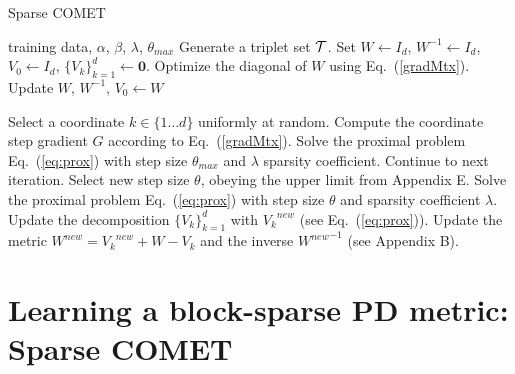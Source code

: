 \documentclass[twoside,11pt]{article}
\newcommand\mat[1]{{#1}}
\renewcommand\vec[1]{\mathbf{#1}}
\newcommand{\W}{\mat{W}}
\newcommand{\newW}{{\mat{W^{new}}}}
\newcommand{\ignore}[1]{}
\newcommand{\Vk}{\mat{V_k}}
\newcommand{\Vz}{\mat{V_0}}
\newcommand{\Vgrc}{\{\Vk\}_{k=1}^{d}} %
\newcommand{\cholL}{\mat{L}}
\renewcommand{\eqref}[1]{Eq.~(\ref{#1})}
\begin{document}
\begin{algorithm}[t]
   \caption{Sparse COMET}
   \label{alg:spcomet}
\begin{algorithmic}[1]
    training data, $\alpha$, $\beta$, $\lambda$, $\theta_{max}$
    Generate a triplet set $\cal{T}$. Set $\W \leftarrow I_d$, $\W^{-1}  \leftarrow I_d$, $\Vz   \leftarrow I_d$, $\Vgrc \leftarrow \vec{0}$. 
   \STATE Optimize the diagonal of $\W$ using \eqref{gradMtx}. Update $\W$, $\W^{-1}$, $\Vz \leftarrow \W$
    
   \REPEAT 
   \STATE Select a coordinate $k \in \{1 \ldots d\}$ uniformly at random.
   \STATE Compute the coordinate step gradient $\mat{G}$ according to \eqref{gradMtx}.
   \STATE Solve the proximal problem \eqref{eq:prox} with step size $\theta_{max}$ and $\lambda$ sparsity coefficient.
   \IF {$\Vk^{new}$ == $\Vk$}
     \STATE Continue to next iteration.
   \ELSE 
      \STATE Select new step size $\theta$, obeying the upper limit from Appendix E.
       \STATE Solve the proximal problem \eqref{eq:prox} with step size $\theta$ and  sparsity coefficient $\lambda$.
      \STATE Update the decomposition $\Vgrc$ with $\Vk^{new}$ (see \eqref{eq:prox}).
      \STATE Update the metric $\newW = \Vk^{new} + \W - \Vk$ and the inverse $\newW^{-1}$ (see Appendix B).
    \ENDIF
\end{algorithmic}
\vskip -5pt
\end{algorithm}

\vspace{-6pt}
\section{Learning a block-sparse PD metric: Sparse COMET}\vskip -5pt
\ignore{The PD metric learned above can be used for extracting new features, but one is often interested to maintain interpretability with \emph{feature selection}: learn a metric which only relies on a small subset of the original feature set, or a small subset of feature pairs. To that end, we develop a method for learning feature-sparse PD metrics, using a block-coordinate descent method that maintains the PD property during training.}

\ignore{
The PD metric learned above does not take into account possible structures often found in feature interactions. }
\end{document}
